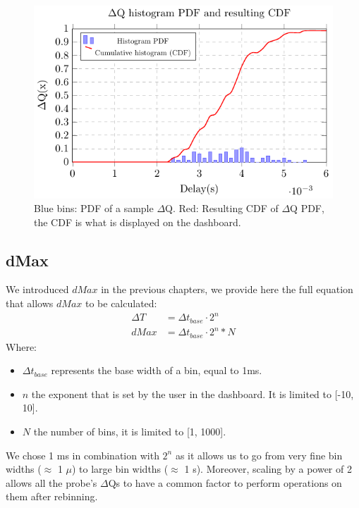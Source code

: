     \begin{figure}[H]
            \begin{center}
                \includegraphics[scale=1]{tikz/pdf_dq.pdf} 
            \end{center}
            \caption{Blue bins: PDF of a sample $\Delta$Q. Red: Resulting CDF of $\Delta$Q PDF, the CDF is what is displayed on the dashboard.}
        \end{figure}

    \subsection{dMax}
        We introduced $dMax$ in the previous chapters, we provide here the full equation that allows $dMax$ to be calculated:
        \begin{equation}
            \begin{split}
                \Delta T &= \Delta t_{base} \cdot 2^n \\ 
                dMax &= \Delta t_{base} \cdot 2^n * N  
            \end{split}
            \label{eq:dMaxU}
        \end{equation}
        Where:
        \begin{itemize}
            \item $\Delta t_{base}$ represents the base width of a bin, equal to 1ms.
            \item $n$ the exponent that is set by the user in the dashboard. It is limited to [-10, 10].
            \item $N$ the number of bins, it is limited to [1, 1000].
        \end{itemize}
            We chose 1 ms in combination with $2^n$ as it allows us to go from very fine bin widths ($\approx$ 1 $\mu$) to large bin widths ($\approx$ 1 s). Moreover, scaling by a power of 2 allows all the probe's $\Delta$Qs to have a common factor to perform operations on them after rebinning.

